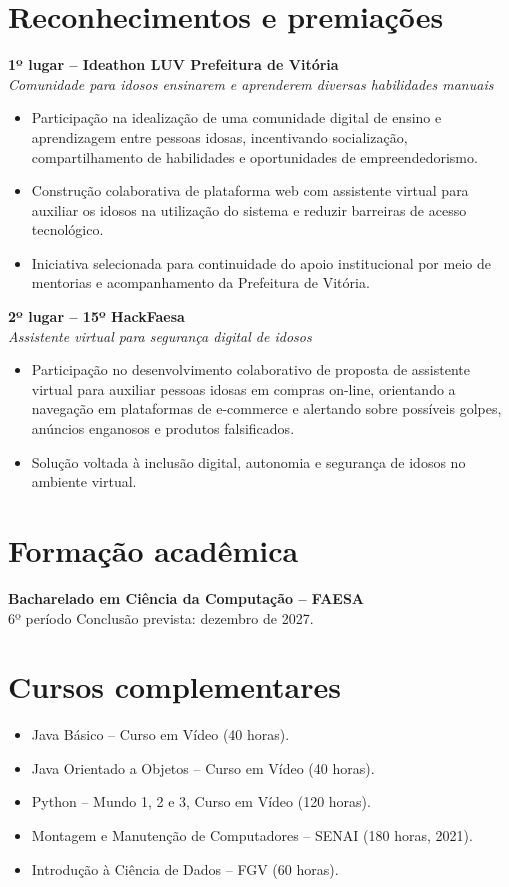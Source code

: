 \documentclass[10pt,a4paper]{article}
\begin{document}
\section*{Reconhecimentos e premiações}
\textbf{1º lugar -- Ideathon LUV \textbar{} Prefeitura de Vitória}\\[-2pt]
\textit{Comunidade para idosos ensinarem e aprenderem diversas habilidades manuais}
\begin{itemize}
\item Participação na idealização de uma comunidade digital de ensino e aprendizagem entre pessoas idosas, incentivando socialização, compartilhamento de habilidades e oportunidades de empreendedorismo.
\item Construção colaborativa de plataforma web com assistente virtual para auxiliar os idosos na utilização do sistema e reduzir barreiras de acesso tecnológico.
\item Iniciativa selecionada para continuidade do apoio institucional por meio de mentorias e acompanhamento da Prefeitura de Vitória.
\end{itemize}
\textbf{2º lugar -- 15º HackFaesa}\\[-2pt]
\textit{Assistente virtual para segurança digital de idosos}
\begin{itemize}
\item Participação no desenvolvimento colaborativo de proposta de assistente virtual para auxiliar pessoas idosas em compras on-line, orientando a navegação em plataformas de e-commerce e alertando sobre possíveis golpes, anúncios enganosos e produtos falsificados.
\item Solução voltada à inclusão digital, autonomia e segurança de idosos no ambiente virtual.
\end{itemize}
\section*{Formação acadêmica}
\textbf{Bacharelado em Ciência da Computação -- FAESA}\\[-2pt]
6º período \textbar{} Conclusão prevista: dezembro de 2027.
\section*{Cursos complementares}
\begin{itemize}
\item Java Básico -- Curso em Vídeo (40 horas).
\item Java Orientado a Objetos -- Curso em Vídeo (40 horas).
\item Python -- Mundo 1, 2 e 3, Curso em Vídeo (120 horas).
\item Montagem e Manutenção de Computadores -- SENAI (180 horas, 2021).
\item Introdução à Ciência de Dados -- FGV (60 horas).
\end{itemize}
\end{document}
